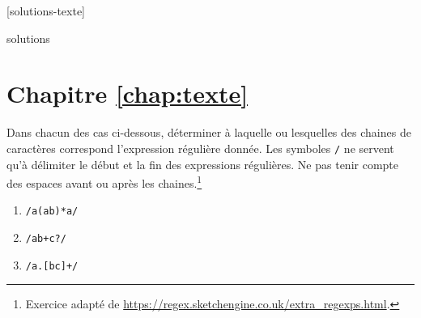 [solutions-texte]

\begin{Filesave}{solutions}
\section*{Chapitre \ref*{chap:texte}}

\end{Filesave}


\begin{exercice}
  Dans chacun des cas ci-dessous, déterminer à laquelle ou lesquelles
  des chaines de caractères correspond l'expression régulière donnée.
  Les symboles \verb=/= ne servent qu'à délimiter le début et la fin
  des expressions régulières. Ne pas tenir compte des espaces avant ou
  après les chaines.\footnote{%
    Exercice adapté de
    \url{https://regex.sketchengine.co.uk/extra_regexps.html}.}
  \begin{enumerate}
    \setlength{\multicolsep}{0pt}
  \item \verb~/a(ab)*a/~
    \begin{enumerate}[1)]
    \end{enumerate}
  \item \verb~/ab+c?/~
    \begin{enumerate}[1)]
    \end{enumerate}
  \item \verb~/a.[bc]+/~
    \begin{enumerate}[1)]
      \begin{multicols}{3}

\end{multicols}
\end{enumerate}
\end{enumerate}
\end{exercice}
